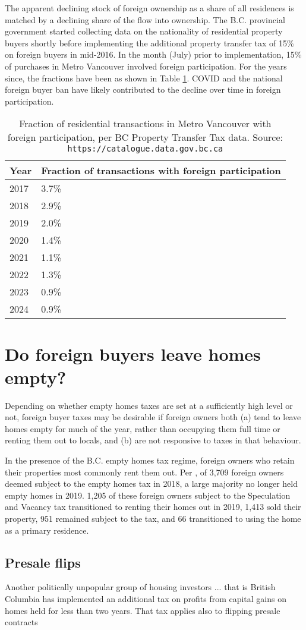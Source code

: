 \documentclass[12pt]{article}
\begin{document}
The apparent declining stock of foreign ownership as a share of all residences
is matched by a declining share of the flow into ownership. The B.C. provincial
government started collecting data on the nationality of residential property
buyers shortly before implementing the additional property transfer tax of 15\%
on foreign buyers in mid-2016. In the month (July) prior to implementation,
15\% of purchases in Metro Vancouver involved foreign participation. For the
years since, the fractions have been as shown in Table \ref{tab:fbt}. COVID and
the national foreign buyer ban have likely contributed to the decline over time
in foreign participation.

\begin{table}
	\caption{\label{tab:fbt} Fraction of residential transactions in Metro Vancouver with foreign participation, per BC Property Transfer Tax data. Source: \texttt{https://catalogue.data.gov.bc.ca}}
	\begin{tabular}{ll}
		\hline
		Year & Fraction of transactions with foreign participation \\
		\hline\hline
		2017 & 3.7\% \\
		2018 & 2.9\% \\
		2019 & 2.0\%\\
		2020 & 1.4\%\\
		2021 & 1.1\%\\
		2022 & 1.3\%\\
		2023 & 0.9\%\\
		2024 & 0.9\%\\
		\hline
	\end{tabular}
\end{table}

\section{Do foreign buyers leave homes empty?}

Depending on whether empty homes taxes are set at a sufficiently high level or not, foreign buyer taxes may be desirable if foreign owners both (a) tend to leave homes empty for much of the year, rather than occupying them full time or renting them out to locals, and (b) are not responsive to taxes in that behaviour. 

In the presence of the B.C. empty homes tax regime, foreign owners who retain their
properties most commonly rent them out. Per \textcite{specTax2019}, of 3,709
foreign owners deemed subject to the empty homes tax in 2018, a large majority no
longer held empty homes in 2019. 1,205 of these foreign owners subject to the
Speculation and Vacancy tax transitioned to renting their homes out in 2019,
1,413 sold their property, 951 remained subject to the tax, and 66 transitioned
to using the home as a primary residence. 

\subsection{Presale flips}

Another politically unpopular group of housing investors ... that is British Columbia has implemented an additional tax on profits from capital gains on homes held for less than two years. That tax applies also to flipping presale contracts
\end{document}
